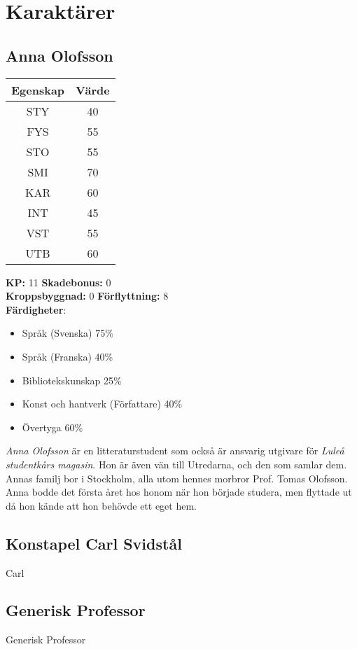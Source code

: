 \section{Karaktärer}
\subsection{Anna Olofsson}
\label{kar:AnnaOlofsson}
\begin{center}
	\begin{tabular}{ | c | c | }
		\hline
		Egenskap & Värde \\
		\hline
		STY & 40 \\
		FYS & 55 \\
		STO & 55 \\
		SMI & 70 \\
		KAR & 60 \\
		INT & 45 \\
		VST & 55 \\
		UTB & 60 \\
		\hline
	\end{tabular}
\end{center}
%
\textbf{KP:} 11 \quad \textbf{Skadebonus:} 0 \\
\textbf{Kroppsbyggnad:} 0 \quad \textbf{Förflyttning:} 8
\\
\textbf{Färdigheter}:
\begin{itemize}
	\item Språk (Svenska) 75\%
	\item Språk (Franska) 40\%
	\item Bibliotekskunskap 25\%
	\item Konst och hantverk (Författare) 40\%
	\item Övertyga 60\%
\end{itemize}
%
\textit{Anna Olofsson} är en litteraturstudent som också är ansvarig utgivare för \textit{Luleå studentkårs magasin}. Hon är även vän till Utredarna, och den som samlar dem. Annas familj bor i Stockholm, alla utom hennes morbror Prof. Tomas Olofsson. Anna bodde det första året hos honom när hon började studera, men flyttade ut då hon kände att hon behövde ett eget hem.
%
\subsection{Konstapel Carl Svidstål}
\label{kar:KonstapelCarlSvidstal}
Carl
%
\subsection{Generisk Professor}
\label{kar:GeneriskProfessor}
Generisk Professor
%
